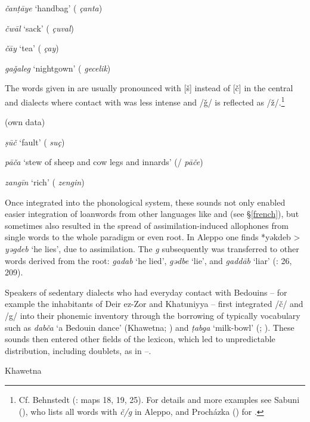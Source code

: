 \documentclass[output=paper]{langsci/langscibook}
\begin{document}
\textit{čanṭāye} ‘handbag’ ( \textit{çanta})

\textit{čwāl} ‘sack’ ( \textit{çuval})

\textit{čāy} ‘tea’ ( \textit{çay})

\textit{gaǧaleg} ‘nightgown’ ( \textit{gecelik})
\z

The words given in  are usually pronounced with [š] instead of [č] in the central  and  dialects where contact with  was less intense and /ǧ/ is reflected as /ž/.\footnote{Cf. Behnstedt (\citeyear{Behnstedt1997}: maps 18, 19, 25). For details and more examples see Sabuni (\citeyear[205--210]{Sabuni1980}), who lists all words with \textit{č/g} in Aleppo, and Procházka (\citeyear[185]{Procházka2002Adana}) for  .}

\ea\label{Mosul}
 (own data)

\textit{ṣūč} ‘fault’ ( \textit{suç})

\textit{pāča} ‘stew of sheep and cow legs and innards’ (/ \textit{pāče})

\textit{zangīn} ‘rich’ ( \textit{zengin})
\z

Once integrated into the phonological system, these sounds not only enabled easier integration of {loanwords} from other languages like  and  (see §\ref{french}), but sometimes also resulted in the spread of assimilation-induced allophones from single words to the whole paradigm or even {root}. In Aleppo one finds *yəkdeb > \textit{yəgdeb} ‘he lies’, due to assimilation. The \textit{g} subsequently was transferred to other words derived from the {root}: \textit{gadab} ‘he lied’, \textit{gədbe} ‘lie’, and \textit{gaddāb} ‘liar’ (\citealt{Sabuni1980}: 26, 209). 

Speakers of sedentary dialects who had everyday contact with Bedouins – for example the inhabitants of Deir ez-Zor and Khatuniyya – first integrated /č/ and /g/ into their phonemic inventory through the borrowing of typically  vocabulary such as \textit{dabča} ‘a Bedouin dance’ (Khawetna; \citealt[29]{Talay1999}) and \textit{ṭabga} ‘milk-bowl’ (; \citealt[310]{Behnstedt1994Soukhne}). These sounds then entered other fields of the lexicon, which led to unpredictable distribution, including doublets, as in --.

\ea\label{Khawetna} Khawetna \citep[28--31]{Talay1999}  
\end{document}
